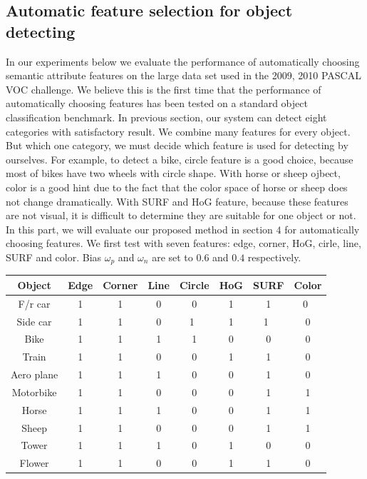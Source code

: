 \subsection{Automatic feature selection for object detecting}
In our experiments below we evaluate the performance of
automatically choosing semantic attribute features on the large data
set used in the 2009, 2010 PASCAL VOC challenge. We believe this
is the first time that the performance of automatically choosing
features has been tested on a standard object classification
benchmark.
In previous section, our system can detect eight categories with
satisfactory result. We combine many features for every object. But
which one category, we must decide which feature is used for
detecting by ourselves. For example, to detect a bike, circle feature is
a good choice, because most of bikes have two wheels with circle
shape. With horse or sheep ojbect, color is a good hint 
due to the fact that the color space of horse or sheep does not change dramatically. With SURF and HoG
feature, because these features are not visual, it is difficult to determine they are suitable for one object or not. In this part, we will evaluate our proposed method in section $4$ for automatically choosing features. We first test with seven features:
edge, corner, HoG, cirle, line, SURF and color. Bias $\omega_p$ and $\omega_n$ are set to $0.6$ and $0.4$ respectively.
\begin{table}[htbp]
\small
\begin{tabular}{|c|c|c|c|c|c|c|c|}%
    \hline
    Object & Edge & Corner & Line & Circle & HoG & SURF & Color \\ \hline
	F/r car & 1 & 1 & 0 & 0 & 1 & 1 & 0  \\ \hline
	Side car & 1 & 1 & 0 & 1 & 1 &  1 & 0  \\ \hline
	Bike & 1 & 1 & 1 & 1 & 0 & 0 & 0  \\ \hline
	Train & 1 & 1 & 0 & 0 & 1 & 1 & 0  \\ \hline
	Aero plane & 1 & 1  & 1 & 0 & 0 & 1 & 0  \\ \hline
	Motorbike & 1  & 1 & 0 & 0 & 0 & 1 & 1  \\ \hline
	Horse & 1 &  1 & 1 & 0 & 0 & 1 & 1  \\ \hline
	Sheep & 1 & 1 & 0 & 0 & 0 & 1 & 1  \\ \hline
	Tower & 1 & 1 & 1 & 0 & 1 & 0 & 0  \\ \hline
	Flower & 1 & 1 & 0 & 0 & 1 & 1 & 0  \\ \hline
\end{tabular}
\label{table:auto_feature_select}
\end{table}
